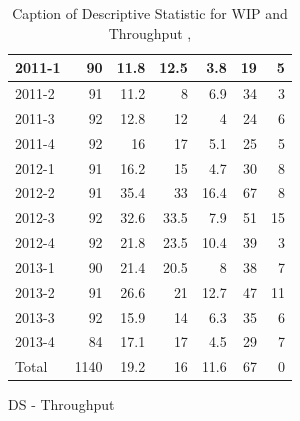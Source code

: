 \documentclass[UKenglish]{ifimaster}  %
\begin{document}
\begin{appendices}
\begin{table}[!htbp]
\begin{adjustwidth}{-1.5cm}{}
\begin{subfigure}[b]{0.3\textwidth}
{\begin{tabular}{ | l | r | r | r | r | r | r | }
 2011-1  & 90 & 11.8 & 12.5 & 3.8 & 19 & 5 \\ \hline
 2011-2  & 91 & 11.2 & 8 & 6.9 & 34 & 3 \\ \hline
 2011-3  & 92 & 12.8 & 12 & 4 & 24 & 6 \\ \hline
 2011-4  & 92 & 16 & 17 & 5.1 & 25 & 5 \\ \hline
 2012-1  & 91 & 16.2 & 15 & 4.7 & 30 & 8 \\ \hline
 2012-2  & 91 & 35.4 & 33 & 16.4 & 67 & 8 \\ \hline
 2012-3  & 92 & 32.6 & 33.5 & 7.9 & 51 & 15 \\ \hline
 2012-4  & 92 & 21.8 & 23.5 & 10.4 & 39 & 3 \\ \hline
 2013-1  & 90 & 21.4 & 20.5 & 8 & 38 & 7 \\ \hline
 2013-2  & 91 & 26.6 & 21 & 12.7 & 47 & 11 \\ \hline
 2013-3  & 92 & 15.9 & 14 & 6.3 & 35 & 6 \\ \hline
 2013-4  & 84 & 17.1 & 17 & 4.5 & 29 & 7 \\ \hline
 Total  & 1140 & 19.2 & 16 & 11.6 & 67 & 0\\ \hline
\end{tabular}
}
\caption{DS - Throughput}
 \label{DS:Throughput:9}
\end{subfigure}
\end{adjustwidth}
\caption[Optional caption for list of figures]{Caption of Descriptive Statistic for WIP and Throughput  , }
\label{DS:9:1}
\end{table}


\end{appendices}
\end{document}
